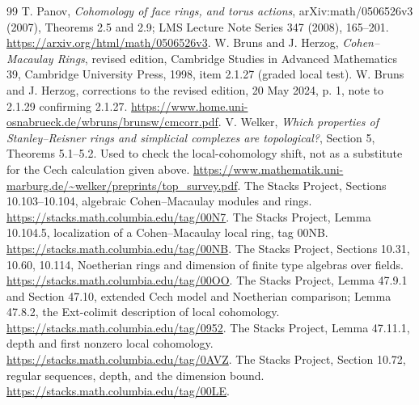 \begin{thebibliography}{99}
 T. Panov, \emph{Cohomology of face rings, and torus actions},
arXiv:math/0506526v3 (2007), Theorems 2.5 and 2.9;
LMS Lecture Note Series 347 (2008), 165--201.
\url{https://arxiv.org/html/math/0506526v3}.
 W. Bruns and J. Herzog, \emph{Cohen--Macaulay Rings},
revised edition, Cambridge Studies in Advanced Mathematics 39,
Cambridge University Press, 1998, item 2.1.27 (graded local test).
 W. Bruns and J. Herzog, corrections to the revised
edition, 20 May 2024, p. 1, note to 2.1.29 confirming 2.1.27.
\url{https://www.home.uni-osnabrueck.de/wbruns/brunsw/cmcorr.pdf}.
 V. Welker, \emph{Which properties of Stanley--Reisner
rings and simplicial complexes are topological?}, Section 5, Theorems
5.1--5.2. Used to check the local-cohomology shift, not as a substitute
for the Cech calculation given above.
\url{https://www.mathematik.uni-marburg.de/~welker/preprints/top_survey.pdf}.
 The Stacks Project, Sections 10.103--10.104,
algebraic Cohen--Macaulay modules and rings.
\url{https://stacks.math.columbia.edu/tag/00N7}.
 The Stacks Project, Lemma 10.104.5,
localization of a Cohen--Macaulay local ring, tag 00NB.
\url{https://stacks.math.columbia.edu/tag/00NB}.
 The Stacks Project, Sections 10.31, 10.60,
10.114, Noetherian rings and dimension of finite type algebras over fields.
\url{https://stacks.math.columbia.edu/tag/00OO}.
 The Stacks Project, Lemma 47.9.1 and Section 47.10,
extended Cech model and Noetherian comparison; Lemma 47.8.2, the Ext-colimit
description of local cohomology.
\url{https://stacks.math.columbia.edu/tag/0952}.
 The Stacks Project, Lemma 47.11.1, depth and
first nonzero local cohomology.
\url{https://stacks.math.columbia.edu/tag/0AVZ}.
 The Stacks Project, Section 10.72,
regular sequences, depth, and the dimension bound.
\url{https://stacks.math.columbia.edu/tag/00LE}.
\end{thebibliography}
